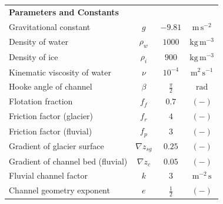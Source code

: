 \documentclass[11pt]{article}
\newcommand{\unit}[1]{$\mathrm{#1}$}
\begin{document}
\begin{spacing}{1}
\begin{table}[H]
\begin{tabular}{ l  c  c c }
      \textbf{Parameters and Constants}  & & &\\
      Gravitational constant&$g$& $-9.81$&$\mathrm{m\,s^{-2}}$\\
      Density of water & $\rho_w$& $1000$ & $\mathrm{kg\,m^{-3}}$ \\
      Density of ice & $\rho_i$& $900$ & $\mathrm{kg\,m^{-3}}$ \\
      Kinematic viscosity of water &$\nu$& $10^{-4}$& $\mathrm{m^2\,s^{-1}}$\\
      Hooke angle of channel & $\beta$ & $\frac{\pi}{2}$ & \unit{rad}\\
      Flotation fraction & $f_f$&$0.7$& $\mathrm{(-)}$\\
      Friction factor (glacier) & $f_r$ & $4$ & $\mathrm{(-)}$ \\
      Friction factor (fluvial) & $f_p$ & $3$ & $\mathrm{(-)}$\\
      Gradient of glacier surface & $\nabla z_{sg}$ &$0.25$& $\mathrm{(-)}$\\
      Gradient of channel bed (fluvial) &$\nabla z_{c}$ &$0.05$& $\mathrm{(-)}$\\
      Fluvial channel factor & $k$ &$3$ & $\mathrm{m^{-2}\, s}$\\
      Channel geometry exponent &$e$& $\frac{1}{2}$&$\mathrm{(-)}$ \\
      \hline
    \end{tabular}
    \label{table:vpm}
  \end{table}

  

\end{spacing}
\end{document}
